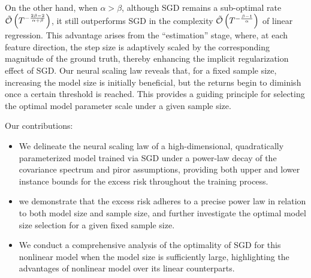On the other hand, when $\alpha> \beta$, although SGD remains a sub-optimal rate $\Tilde{\mathcal{O}}\left(T^{-\frac{2\beta-2}{\alpha+\beta}}\right)$,  it still outperforms SGD in the complexity  $\Tilde{\mathcal{O}} \left ( T^{-\frac{\beta-1}{\alpha} } \right )$ of linear regression.
This advantage arises from the ``estimation'' stage, where, at each feature direction, the step size is adaptively scaled by the corresponding magnitude of the ground truth, thereby enhancing the implicit regularization effect of SGD.
Our neural scaling law reveals that, for a fixed sample size, increasing the model size is initially beneficial, but the returns begin to diminish once a certain threshold is reached. This provides a guiding principle for selecting the optimal model parameter scale under a given sample size.


Our contributions:
\begin{itemize}
    \item We delineate the neural scaling law of a high-dimensional, quadratically parameterized model trained via SGD under a power-law decay of the covariance spectrum and piror assumptions, providing both upper and lower instance bounds for the excess risk throughout the training process.
    \item we demonstrate that the excess risk adheres to a precise power law in relation to both model size and sample size, and further investigate the optimal model size selection for a given fixed sample size.
    \item We conduct a comprehensive analysis of the optimality of SGD for this nonlinear model when the model size is sufficiently large, highlighting the advantages of nonlinear model over its linear counterparts.
\end{itemize}
\fi